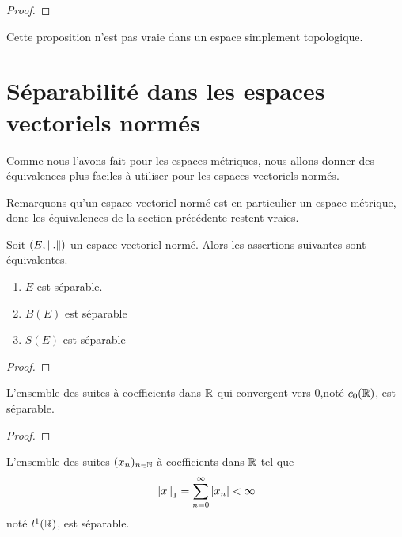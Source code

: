 \ifdefined\outputproof
\begin{proof}

\end{proof}
\fi

\begin{remarque}
	Cette proposition n'est pas vraie dans un espace simplement topologique.
\end{remarque}

\section{Séparabilité dans les espaces vectoriels normés}

Comme nous l'avons fait pour les espaces métriques, nous allons donner des
équivalences plus faciles à utiliser pour les espaces vectoriels normés.

Remarquons qu'un espace vectoriel normé est en particulier un espace
métrique, donc les équivalences de la section précédente restent vraies.

\begin{proposition}
	Soit $(E, \norm{.})$ un espace vectoriel normé. Alors les
	assertions suivantes sont équivalentes.
	\begin{enumerate}
		\item $E$ est séparable.
		\item $B(E)$ est séparable
		\item $S(E)$ est séparable
	\end{enumerate}
\end{proposition}

\ifdefined\outputproof
\begin{proof}

\end{proof}
\fi

\begin{proposition}
	L'ensemble des suites à coefficients dans $\mathbb{R}$ qui convergent vers 0,noté
	$c_{0}(\mathbb{R})$, est séparable.
\end{proposition}

\ifdefined\outputproof
\begin{proof}

\end{proof}
\fi

\begin{proposition}
	L'ensemble des suites $(x_{n})_{n \in \mathbb{N}}$ à coefficients dans $\mathbb{R}$ tel que
	\begin{equation}
		\norm{x}_{1} = \displaystyle \sum_{n = 0}^{\infty} \abs{x_{n}} < \infty
	\end{equation}
	noté $l^{1}(\mathbb{R})$, est séparable.
\end{proposition}

